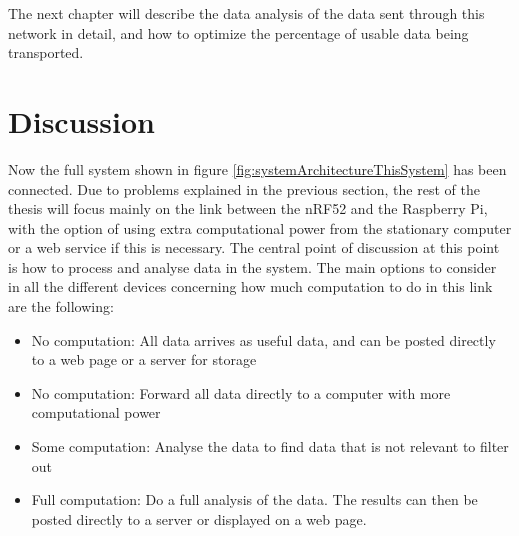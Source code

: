 \noindent The next chapter will describe the data analysis of the data sent through this network in detail, and how to optimize the percentage of usable data being transported.  

\newpage

\section{Discussion}

\noindent Now the full system shown in figure \ref{fig:systemArchitectureThisSystem} has been connected. Due to problems explained in the previous section, the rest of the thesis will focus mainly on the link between the \gls{nRF52} and the \gls{Raspberry Pi}, with the option of using extra computational power from the stationary computer or a web service if this is necessary. The central point of discussion at this point is how to process and analyse data in the system. The main options to consider in all the different devices concerning how much computation to do in this link are the following: 

\begin{itemize}
  \item No computation: All data arrives as useful data, and can be posted directly to a web page or a server for storage
  \item No computation: Forward all data directly to a computer with more computational power
  \item Some computation: Analyse the data to find data that is not relevant to filter out
  \item Full computation: Do a full analysis of the data. The results can then be posted directly to a server or displayed on a web page. 
\end{itemize}

